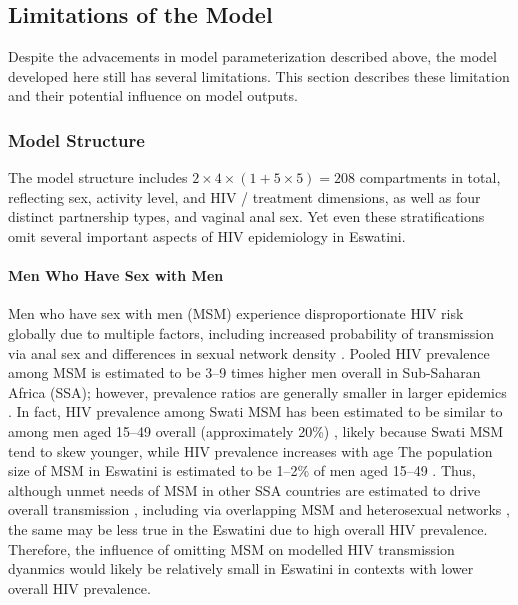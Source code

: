 \subsection{Limitations of the Model}\label{model.disc.lim}
Despite the advacements in model parameterization described above,
the model developed here still has several limitations.
This section describes these limitation and their potential influence on model outputs.
\subsubsection{Model Structure}\label{model.disc.lim.str}
The model structure includes $2 \times 4 \times (1 + 5 \times 5) = 208$ compartments in total,
reflecting sex, activity level, and HIV / treatment dimensions,
as well as four distinct partnership types, and vaginal \vs anal sex.
Yet even these stratifications omit several important aspects of HIV epidemiology in Eswatini.
\paragraph{Men Who Have Sex with Men}
Men who have sex with men (MSM) experience disproportionate HIV risk globally
due to multiple factors, including
increased probability of transmission via anal sex and differences in sexual network density
\cite{Beyrer2012,Hessou2019}.
Pooled HIV prevalence among MSM is estimated to be
3--9 times higher \vs men overall in Sub-Saharan Africa (SSA);
however, prevalence ratios are generally smaller in larger epidemics \cite{Hessou2019}.
In fact, HIV prevalence among Swati MSM has been estimated to be
similar to among men aged 15--49 overall (approximately 20\%) \cite{Hessou2019,EswIBBS2022,SHIMS2},
likely because Swati MSM tend to skew younger, while HIV prevalence increases with age
\cite{SHIMS2,EswIBBS2022}
The population size of MSM in Eswatini is estimated to be
1--2\% of men aged 15--49 \cite{EswKP2014,EswIBBS2022,WorldBank}.
Thus, although unmet needs of MSM in other SSA countries
are estimated to drive overall transmission \cite{Stone2021,Silhol2021},
including via overlapping MSM and heterosexual networks \cite{Beyrer2010},
the same may be less true in the Eswatini due to high overall HIV prevalence.
Therefore, the influence of omitting MSM on modelled HIV transmission dyanmics
would likely be relatively small in Eswatini \vs in contexts with lower overall HIV prevalence.
